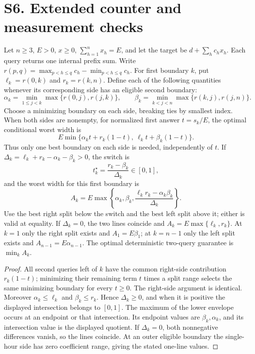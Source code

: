 \section{S6. Extended counter and measurement checks}
\begin{proposition}
Let $n\geq3$, $E>0$, $x\geq0$, $\sum_{h=1}^n x_h=E$, and let the target be
$d+\sum_hc_hx_h$. Each query returns one internal prefix sum. Write
$r(p,q)=\max_{p<h\leq q}c_h-\min_{p<h\leq q}c_h$.
For first boundary $k$, put $\ell_k=r(0,k)$ and $r_k=r(k,n)$.
Define each of the following quantities whenever its corresponding
side has an eligible second boundary:
\[
 \alpha_k=\min_{1\leq j<k}\max\{r(0,j),r(j,k)\},\qquad
 \beta_k=\min_{k<j<n}\max\{r(k,j),r(j,n)\}.
\]
Choose a minimizing boundary on each side, breaking ties by smallest index.
When both sides are nonempty, for normalized first answer $t=s_k/E$,
the optimal conditional worst width is
\[
 E\min\{\alpha_k t+r_k(1-t),\ \ell_k t+\beta_k(1-t)\}.
\]
Thus only one best boundary on each side is needed, independently of $t$.
If $\Delta_k=\ell_k+r_k-\alpha_k-\beta_k>0$, the switch is
\[
 t_k^\star=\frac{r_k-\beta_k}{\Delta_k}\in[0,1],
\]
and the worst width for this first boundary is
\[
 A_k=E\max\left\{\alpha_k,\beta_k,
          \frac{\ell_kr_k-\alpha_k\beta_k}{\Delta_k}\right\}.
\]
Use the best right split below the switch and the best left split above
it; either is valid at equality. If $\Delta_k=0$, the two lines coincide
and $A_k=E\max\{\ell_k,r_k\}$. At $k=1$ only the right split exists and
$A_1=E\beta_1$; at $k=n-1$ only the left split exists and
$A_{n-1}=E\alpha_{n-1}$. The optimal deterministic two-query guarantee is
$\min_k A_k$.
\end{proposition}
\begin{proof}
All second queries left of $k$ have the common right-side contribution
$r_k(1-t)$; minimizing their remaining term $t$ times a split range
selects the same minimizing boundary for every $t\geq0$. The right-side
argument is identical. Moreover $\alpha_k\leq\ell_k$ and
$\beta_k\leq r_k$. Hence $\Delta_k\geq0$, and when it is positive the
displayed intersection belongs to $[0,1]$. The maximum of the lower
envelope occurs at an endpoint or that intersection. Its endpoint
values are $\beta_k,\alpha_k$, and its intersection value is the displayed
quotient. If $\Delta_k=0$, both nonnegative differences vanish, so the
lines coincide. At an outer eligible boundary the single-hour side has
zero coefficient range, giving the stated one-line values.
\end{proof}

